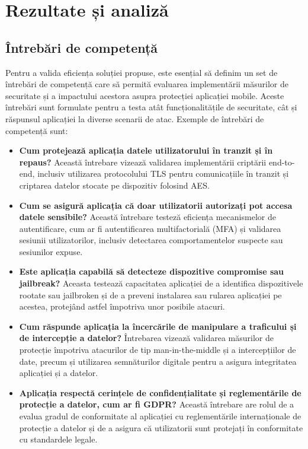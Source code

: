 \documentclass[runningheads]{llncs}
\begin{document}
\section{Rezultate și analiză}

\subsection{Întrebări de competență}
Pentru a valida eficiența soluției propuse, este esențial să definim un set de întrebări de competență care să permită evaluarea implementării măsurilor de securitate și a impactului acestora asupra protecției aplicației mobile. Aceste întrebări sunt formulate pentru a testa atât funcționalitățile de securitate, cât și răspunsul aplicației la diverse scenarii de atac. Exemple de întrebări de competență sunt:

\begin{itemize}
  \item \textbf{Cum protejează aplicația datele utilizatorului în tranzit și în repaus?}  
  Această întrebare vizează validarea implementării criptării end-to-end, inclusiv utilizarea protocolului TLS pentru comunicațiile în tranzit și criptarea datelor stocate pe dispozitiv folosind AES.
  
  \item \textbf{Cum se asigură aplicația că doar utilizatorii autorizați pot accesa datele sensibile?}  
  Această întrebare testeză eficiența mecanismelor de autentificare, cum ar fi autentificarea multifactorială (MFA) și validarea sesiunii utilizatorilor, inclusiv detectarea comportamentelor suspecte sau sesiunilor expuse.
  
  \item \textbf{Este aplicația capabilă să detecteze dispozitive compromise sau jailbreak?}  
  Aceasta testează capacitatea aplicației de a identifica dispozitivele rootate sau jailbroken și de a preveni instalarea sau rularea aplicației pe acestea, protejând astfel împotriva unor posibile atacuri.
  
  \item \textbf{Cum răspunde aplicația la încercările de manipulare a traficului și de intercepție a datelor?}  
  Întrebarea vizează validarea măsurilor de protecție împotriva atacurilor de tip man-in-the-middle și a intercepțiilor de date, precum și utilizarea semnăturilor digitale pentru a asigura integritatea aplicației și a datelor.
  
  \item \textbf{Aplicația respectă cerințele de confidențialitate și reglementările de protecție a datelor, cum ar fi GDPR?}  
  Această întrebare are rolul de a evalua gradul de conformitate al aplicației cu reglementările internaționale de protecție a datelor și de a asigura că utilizatorii sunt protejați în conformitate cu standardele legale.
\end{itemize}
\end{document}
